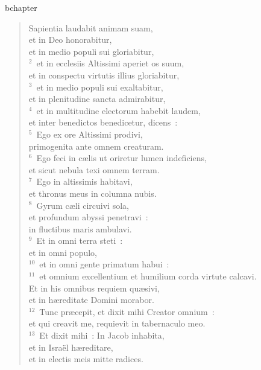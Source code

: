 bchapter\begin{verse}\vspace{-19pt}Sapientia laudabit animam suam,\\ et in Deo honorabitur,\\ et in medio populi sui gloriabitur,\\
${}^{2}$~et in ecclesiis Altissimi aperiet os suum,\\ et in conspectu virtutis illius gloriabitur,\\
${}^{3}$~et in medio populi sui exaltabitur,\\ et in plenitudine sancta admirabitur,\\
${}^{4}$~et in multitudine electorum habebit laudem,\\ et inter benedictos benedicetur, dicens~:\\
${}^{5}$~Ego ex ore Altissimi prodivi,\\ primogenita ante omnem creaturam.\\
${}^{6}$~Ego feci in c\ae lis ut oriretur lumen indeficiens,\\ et sicut nebula texi omnem terram.\\
${}^{7}$~Ego in altissimis habitavi,\\ et thronus meus in columna nubis.\\
${}^{8}$~Gyrum c\ae li circuivi sola,\\ et profundum abyssi penetravi~:\\ in fluctibus maris ambulavi.\\
${}^{9}$~Et in omni terra steti~:\\ et in omni populo,\\
${}^{10}$~et in omni gente primatum habui~:\\
${}^{11}$~et omnium excellentium et humilium corda virtute calcavi.\\ Et in his omnibus requiem qu\ae sivi,\\ et in h\ae reditate Domini morabor.\\
${}^{12}$~Tunc pr\ae cepit, et dixit mihi Creator omnium~:\\ et qui creavit me, requievit in tabernaculo meo.\\
${}^{13}$~Et dixit mihi~: In Jacob inhabita,\\ et in Isra\"el h\ae reditare,\\ et in electis meis mitte radices.\end{verse}


